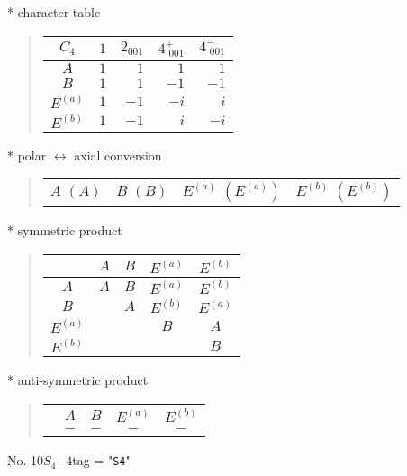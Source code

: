 \documentclass[fleqn,10pt,landscape]{jsarticle}
\begin{document}
* character table
\begin{quote}
\begin{tabular}{crrrr} \hline \hline
$ C_{4} $ & $ 1 $ & $ 2{}_{001} $ & $ 4^{+}_{\,\,001} $ & $ 4^{-}_{\,\,001} $ \\ \hline
$ A $ & $ 1 $ & $ 1 $ & $ 1 $ & $ 1 $ \\
$ B $ & $ 1 $ & $ 1 $ & $ -1 $ & $ -1 $ \\
$ E^{(a)} $ & $ 1 $ & $ -1 $ & $ - i $ & $ i $ \\
$ E^{(b)} $ & $ 1 $ & $ -1 $ & $ i $ & $ - i $ \\
 \hline \hline
\end{tabular}
\end{quote}
* polar $\leftrightarrow$ axial conversion
\begin{quote}
\begin{tabular}{cccc}
$ A\,\,(A) $ & $ B\,\,(B) $ & $ E^{(a)}\,\,(E^{(a)}) $ & $ E^{(b)}\,\,(E^{(b)}) $
\end{tabular}
\end{quote}
* symmetric product
\begin{quote}
\begin{tabular}{c|cccc} \hline \hline
 & $ A $ & $ B $ & $ E^{(a)} $ & $ E^{(b)} $ \\ \hline
$ A $ & $ A $ & $ B $ & $ E^{(a)} $ & $ E^{(b)} $ \\
$ B $ & $  $ & $ A $ & $ E^{(b)} $ & $ E^{(a)} $ \\
$ E^{(a)} $ & $  $ & $  $ & $ B $ & $ A $ \\
$ E^{(b)} $ & $  $ & $  $ & $  $ & $ B $ \\
 \hline \hline
\end{tabular}
\end{quote}
* anti-symmetric product
\begin{quote}
\begin{tabular}{ccccc} \hline \hline
 & $ A $ & $ B $ & $ E^{(a)} $ & $ E^{(b)} $ \\ \hline
$  $ & $ - $ & $ - $ & $ - $ & $ - $ \\
 \hline \hline
\end{tabular}
\end{quote}
\newpage
No. 10\quad$S_{4}$\quad$-4$\quad[ tetragonal ]
tag = "{\tt S4}"
\end{document}

